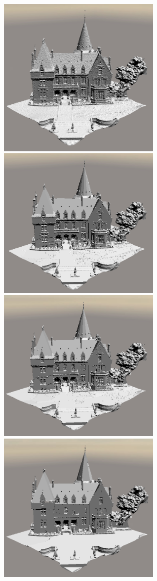 ﻿\documentclass[12pt, twoside]{article}
\begin{document}
\begin{figure}[h]
\centering
\includegraphics[width=8cm,keepaspectratio]{Fleurac.png} \includegraphics[width=8cm,keepaspectratio]{FleuracAuto.png} \includegraphics[width=8cm,keepaspectratio]{Fleurac01.png} \includegraphics[width=8cm,keepaspectratio]{Fleurac1.png} 

\end{figure}
\end{document}

